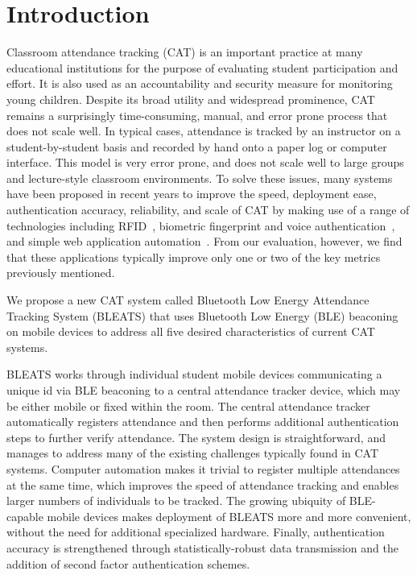 \section{Introduction}

\label{sec:introduction}

Classroom attendance tracking (CAT) is an important practice at many
educational institutions for the purpose of evaluating student participation
and effort. It is also used as an accountability and security measure for
monitoring young children. Despite its broad utility and widespread prominence, CAT
remains a surprisingly time-consuming, manual, and error prone process that
does not scale well. In typical cases, attendance is tracked by an
instructor on a student-by-student basis and recorded by hand onto a paper log
or computer interface. This model is very error prone, and does not scale well
to large groups and lecture-style classroom environments. To solve these issues, many
systems have been proposed in recent years to improve the speed, deployment
ease, authentication accuracy, reliability, and scale of CAT by making use of a
range of technologies including RFID~\cite{kassim2012web}, biometric
fingerprint and voice authentication~\cite{reda2011hyke,taxila2009development},
and simple web application automation~\cite{akhila2013novel}. From our
evaluation, however, we find that these applications typically improve only one
or two of the key metrics previously mentioned. 

We propose a new CAT system called Bluetooth Low Energy Attendance Tracking
System (BLEATS) that uses Bluetooth Low Energy (BLE) beaconing on mobile
devices to address all five desired characteristics of current CAT systems.  

BLEATS works through individual student mobile devices communicating a unique
id via BLE beaconing to a central attendance tracker device, which may be
either mobile or fixed within the room. The central attendance tracker
automatically registers attendance and then performs additional authentication
steps to further verify attendance. The system design is straightforward, and
manages to address  many of the existing challenges typically found in CAT
systems. Computer automation makes it trivial to register multiple attendances
at the same time, which improves the speed of attendance tracking and enables
larger numbers of individuals to be tracked. The growing ubiquity of
BLE-capable mobile devices makes deployment of BLEATS more and more convenient,
without the need for additional specialized hardware. Finally, authentication
accuracy is strengthened through statistically-robust data transmission and the
addition of second factor authentication schemes.  

